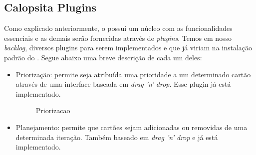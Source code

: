 \subsection{Calopsita Plugins}

Como explicado anteriormente, o \calopsita{} possuí um núcleo com as funcionalidades essenciais e as demais serão fornecidas através de \textit{plugins}. Temos em nosso \textit{backlog}, diversos plugins para serem implementados e que já viriam na instalação padrão do \calopsita{}. Segue abaixo uma breve descrição de cada um deles:

\begin{itemize}
	\item{Priorização: permite seja atribuída uma prioridade a um determinado cartão através de uma interface baseada em \textit{drag 'n' drop}. Esse plugin já está implementado.
	
	\begin{figure}[H]
	  \centering
	  \caption{Priorizacao}\label{figura:priorizacao}
	\end{figure}
	}
	\item{Planejamento: permite que cartões sejam adicionadas ou removidas de uma determinada iteração. Também baseado em \textit{drag 'n' drop} e já está implementado.
	
}
\end{itemize}
